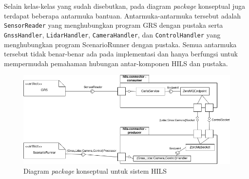 Selain kelas-kelas yang sudah disebutkan, pada diagram \textit{package}
konseptual juga terdapat beberapa antarmuka bantuan. Antarmuka-antarmuka
tersebut adalah \texttt{SensorReader} yang menghubungkan program GRS
dengan pustaka serta \texttt{Gnss\-Hand\-ler}, \texttt{LidarHandler},
\texttt{CameraHandler}, dan \texttt{ControlHandler} yang menghubungkan program
ScenarioRunner dengan pustaka. Semua antarmuka tersebut tidak benar-benar ada
pada implementasi dan hanya berfungsi untuk mempermudah pemahaman hubungan
antar-komponen HILS dan pustaka.
\begin{figure}[!htbp]
	\centering
	\includegraphics[width=1.0\textwidth]{resources/chapter-4/conceptual-package-diagram.png}
	\caption{Diagram \textit{package} konseptual untuk sistem HILS}
	\label{chapter-4-conseptual-package-diagram}
\end{figure}

